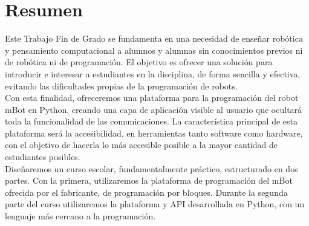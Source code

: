 
\chapter*{Resumen}


\label{cap:resumen}

Este Trabajo Fin de Grado se fundamenta en una necesidad de enseñar robótica y pensamiento computacional a alumnos y alumnas sin conocimientos previos ni de robótica ni de programación. El objetivo es ofrecer una solución para introducir e interesar a estudiantes en la disciplina, de forma sencilla y efectiva, evitando las dificultades propias de la programación de robots.\\

Con esta finalidad, ofreceremos una plataforma para la programación del robot mBot en Python, creando una capa de aplicación visible al usuario que ocultará toda la funcionalidad de las  comunicaciones. La característica principal de esta plataforma será la accesibilidad, en herramientas tanto software como hardware, con el objetivo de hacerla lo más accesible posible a la mayor cantidad de estudiantes posibles.\\

Diseñaremos un curso escolar, fundamentalmente práctico, estructurado en dos partes. Con la primera, utilizaremos la plataforma de programación del mBot ofrecida por el fabricante, de programación por bloques. Durante la segunda parte del curso utilizaremos la plataforma y API desarrollada en Python, con un lenguaje más cercano a la programación.\\

\afterpage{\null\newpage}